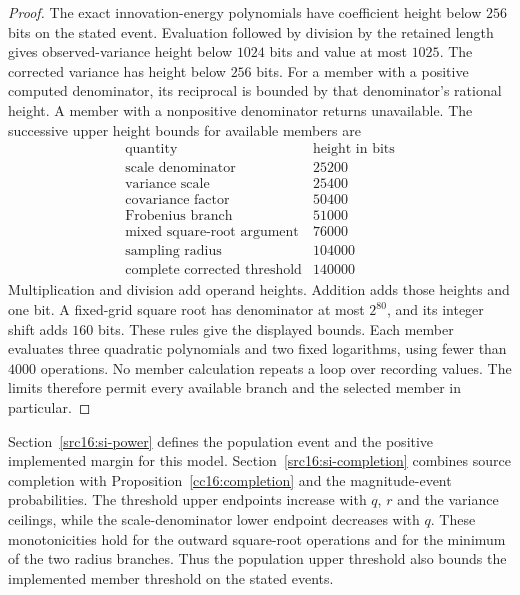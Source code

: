 \begin{proof}
The exact innovation-energy polynomials have coefficient height below $256$ bits on the stated event. Evaluation followed by division by the retained length gives observed-variance height below $1024$ bits and value at most $1025$. The corrected variance has height below $256$ bits. For a member with a positive computed denominator, its reciprocal is bounded by that denominator's rational height. A member with a nonpositive denominator returns unavailable. The successive upper height bounds for available members are
\[
\begin{array}{c|r}
\text{quantity}&\text{height in bits}\\\hline
\text{scale denominator}&25200\\
\text{variance scale}&25400\\
\text{covariance factor}&50400\\
\text{Frobenius branch}&51000\\
\text{mixed square-root argument}&76000\\
\text{sampling radius}&104000\\
\text{complete corrected threshold}&140000
\end{array}
\]
Multiplication and division add operand heights. Addition adds those heights and one bit. A fixed-grid square root has denominator at most $2^{80}$, and its integer shift adds $160$ bits. These rules give the displayed bounds. Each member evaluates three quadratic polynomials and two fixed logarithms, using fewer than $4000$ operations. No member calculation repeats a loop over recording values. The limits therefore permit every available branch and the selected member in particular.
\end{proof}

Section~\ref{src16:si-power} defines the population event and the positive implemented margin for this model. Section~\ref{src16:si-completion} combines source completion with Proposition~\ref{cc16:completion} and the magnitude-event probabilities. The threshold upper endpoints increase with $q$, $r$ and the variance ceilings, while the scale-denominator lower endpoint decreases with $q$. These monotonicities hold for the outward square-root operations and for the minimum of the two radius branches. Thus the population upper threshold also bounds the implemented member threshold on the stated events.
